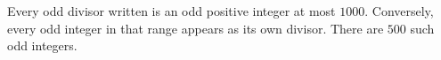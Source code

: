 Every odd divisor written is an odd positive integer at most $1000$. Conversely, every odd integer in that range appears as its own divisor. There are $\boxed{500}$ such odd integers.
